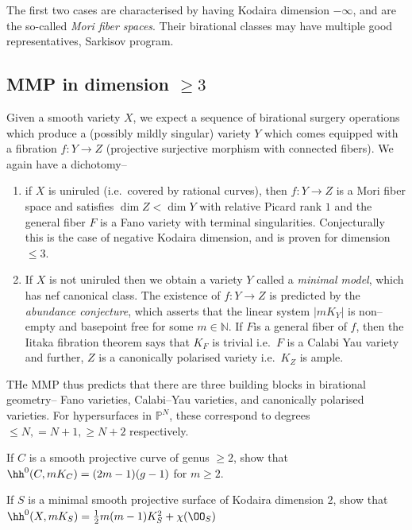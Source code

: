The first two cases are characterised by having Kodaira dimension \(-\infty\),
and are the so-called \emph{Mori fiber spaces}. Their birational classes may
have multiple good representatives, Sarkisov program.

\subsection{MMP in dimension \(\geq 3\)} Given a smooth variety \(X\), we expect
a sequence of birational surgery operations which produce a (possibly mildly
singular) variety \(Y\) which comes equipped with a fibration \(f:Y\to Z\)
(projective surjective morphism with connected fibers). We again have a
dichotomy--

\begin{enumerate}
\item if \(X\) is uniruled (i.e.\ covered by rational curves), then
\(f:Y\to Z\) is a Mori fiber space and satisfies \(\dim Z < \dim Y\) with
relative Picard rank \(1\) and the general fiber \(F\) is a Fano variety with
terminal singularities. Conjecturally this is the case of negative Kodaira
dimension, and is proven for dimension \(\leq 3\).

\item If \(X\) is not uniruled then we obtain a variety \(Y\) called a
\emph{minimal model}, which has nef canonical class. The existence of \(f:Y\to
Z\) is predicted by the \emph{abundance conjecture}, which asserts that
the linear system \(|mK_Y|\) is non--empty and basepoint free for some
\(m\in \mathbb{N}\). If \(F\)is a general fiber of \(f\), then the Iitaka
fibration theorem says that \(K_F\) is trivial i.e.\ \(F\) is a Calabi Yau
variety and further, \(Z\) is a canonically polarised variety i.e.\ \(K_Z\) is
ample.
\end{enumerate}

THe MMP thus predicts that there are three building blocks in birational
geometry-- Fano varieties, Calabi--Yau varieties, and canonically polarised
varieties. For hypersurfaces in \(\mathbb{P}^N\), these correspond to degrees
\(\leq N, =N+1, \geq N+2\) respectively.

\begin{exercise}
    If \(C\) is a smooth projective curve of genus \(\geq 2\), show that
    \(\hh^0(C, mK_C)=(2m-1)(g-1)\) for \(m\geq 2\).
\end{exercise}

\begin{exercise}
    If \(S\) is a minimal smooth projective surface of Kodaira dimension \(2\),
    show that \(\hh^0(X,mK_S)=\frac{1}{2}m(m-1)K_S^2+\chi(\OO_S)\)
\end{exercise}

